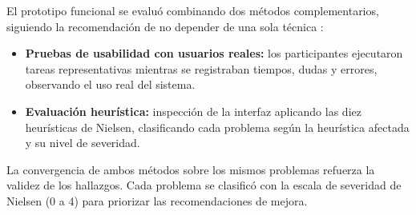 El prototipo funcional se evaluó combinando dos métodos complementarios, siguiendo la recomendación de no depender de una sola técnica \autocite{rubin2008,nielsen1994}:

\begin{itemize}
  \item \textbf{Pruebas de usabilidad con usuarios reales:} los participantes ejecutaron tareas representativas mientras se registraban tiempos, dudas y errores, observando el uso real del sistema.
  \item \textbf{Evaluación heurística:} inspección de la interfaz aplicando las diez heurísticas de Nielsen, clasificando cada problema según la heurística afectada y su nivel de severidad.
\end{itemize}

La convergencia de ambos métodos sobre los mismos problemas refuerza la validez de los hallazgos. Cada problema se clasificó con la escala de severidad de Nielsen (0 a 4) para priorizar las recomendaciones de mejora.
